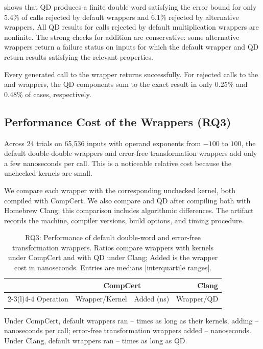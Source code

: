  shows that QD produces a finite double word satisfying
the error bound for only $5.4\%$ of calls rejected by default wrappers and
$6.1\%$ rejected by alternative wrappers. All QD results for calls rejected by
default multiplication wrappers are nonfinite. The strong checks for addition
are conservative: some alternative wrappers return a failure status on inputs
for which the default wrapper and QD return results satisfying the relevant
properties.

Every generated call to the \TwoSum{} wrapper returns successfully. For
rejected calls to the \FastTwoSum{} and \FastTwoMult{} wrappers, the QD
components sum to the exact result in only $0.25\%$ and $0.48\%$ of cases,
respectively.

\subsection{Performance Cost of the Wrappers (RQ3)}

Across 24 trials on 65,536 inputs with operand exponents from $-100$ to $100$,
the default double-double wrappers and error-free transformation wrappers add
only a few nanoseconds per call. This is a noticeable relative cost because
the unchecked kernels are small.

We compare each wrapper with the corresponding un\-checked kernel,
both compiled with CompCert.
We also compare \FenceDD{} and QD after compiling both with
Homebrew Clang; this comparison includes algorithmic differences.
The artifact records the machine, compiler versions, build options,
and timing procedure.
%
\begin{table}[tbp]
\caption{RQ3: Performance of default double-word and error-free transformation
wrappers. Ratios compare wrappers with kernels under CompCert and with QD under
Clang; Added is the wrapper cost in nanoseconds. Entries are medians
[interquartile ranges].}
  \label{tab:rq3-performance}
  \centering
  \setlength{\tabcolsep}{3pt}
  \begin{tabular}{@{}lrrr@{}}
    \toprule
    & \multicolumn{2}{c}{CompCert} & Clang \\
    \cmidrule(lr){2-3}\cmidrule(l){4-4}
    Operation & Wrapper/Kernel & Added (ns) & Wrapper/QD \\
    \midrule
    \\
    \bottomrule
  \end{tabular}
\end{table}
%
Under CompCert, default wrappers ran
\RQThreeDefaultMinimumKernelRatio{}--\RQThreeDefaultMaximumKernelRatio{} times
as long as their kernels, adding
\RQThreeDefaultMinimumAddedTime{}--\RQThreeDefaultMaximumAddedTime{}
nanoseconds per call; error-free transformation wrappers added
\RQThreeTransformationMinimumAddedTime{}--\RQThreeTransformationMaximumAddedTime{}
nanoseconds. Under Clang, default wrappers ran
\RQThreeDefaultMinimumQDRatio{}--\RQThreeDefaultMaximumQDRatio{} times as long
as QD.

